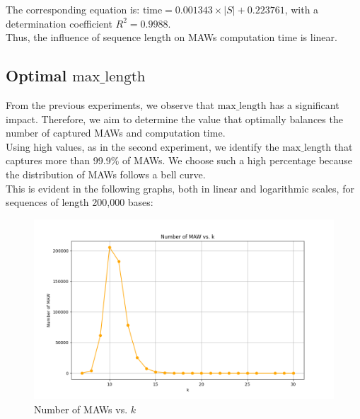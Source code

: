 \documentclass[conference]{IEEEtran}
\begin{document}
The corresponding equation is: $\text{time} = 0.001343 \times |S| + 0.223761$, with a determination coefficient $R^2 = 0.9988$.\\
Thus, the influence of sequence length on MAWs computation time is linear.
\subsection{Optimal $\text{max\_length}$}
From the previous experiments, we observe that $\text{max\_length}$ has a significant impact. Therefore, we aim to determine the value that optimally balances the number of captured MAWs and computation time.\\
Using high values, as in the second experiment, we identify the $\text{max\_length}$ that captures more than 99.9\% of MAWs. We choose such a high percentage because the distribution of MAWs follows a bell curve.\\
This is evident in the following graphs, both in linear and logarithmic scales, for sequences of length 200,000 bases:
\begin{figure}[htbp]
\centerline{\includegraphics[scale=0.30]{number of MAW vs k.png}}
\caption{Number of MAWs vs. $k$}
\label{fig}
\end{figure}
\end{document}
